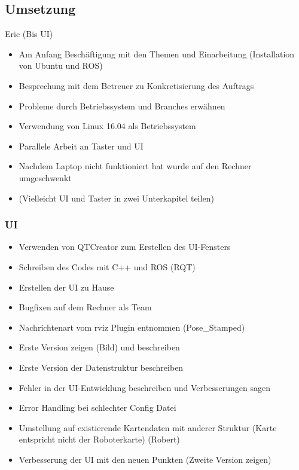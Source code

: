\documentclass[a4paper,12pt,headsepline]{scrartcl}
\begin{document}
	\subsection{Umsetzung}
		Eric (Bis UI)\\
		\begin{itemize}
			\item Am Anfang Beschäftigung mit den Themen und Einarbeitung (Installation von Ubuntu und ROS)
			\item Besprechung mit dem Betreuer zu Konkretisierung des Auftrags

			\item Probleme durch Betriebssystem und Branches erwähnen
			\item Verwendung von Linux 16.04 als Betriebssystem
			\item Parallele Arbeit an Taster und UI
			\item Nachdem Laptop nicht funktioniert hat wurde auf den Rechner umgeschwenkt
			\item (Vielleicht UI und Taster in zwei Unterkapitel teilen)
		\end{itemize}
			\subsubsection{UI}
			\begin{itemize}
				\item Verwenden von QTCreator zum Erstellen des UI-Fensters
				\item Schreiben des Codes mit C++ und ROS (RQT)
				\item Erstellen der UI zu Hause
				\item Bugfixen auf dem Rechner als Team
				\item Nachrichtenart vom rviz Plugin entnommen (Pose{\_}Stamped)
				\item Erste Version zeigen (Bild) und beschreiben
				\item Erste Version der Datenstruktur beschreiben
				\item Fehler in der UI-Entwicklung beschreiben und Verbesserungen sagen
				\item Error Handling bei schlechter Config Datei
				\item Umstellung auf existierende Kartendaten mit anderer Struktur (Karte entspricht nicht der Roboterkarte) (Robert)
				\item Verbesserung der UI mit den neuen Punkten (Zweite Version zeigen)
			\end{itemize}
			
\end{document}
